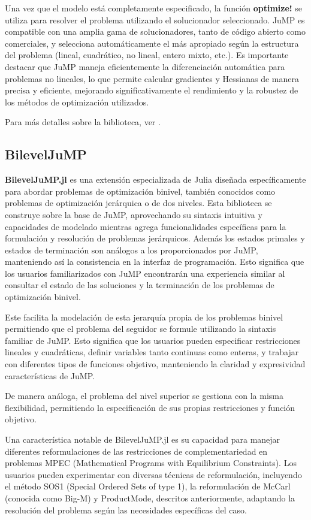 Una vez que el modelo está completamente especificado, la función \textbf{optimize!} se utiliza para resolver el problema utilizando el solucionador seleccionado. JuMP es compatible con una amplia gama de solucionadores, tanto de código abierto como comerciales, y selecciona automáticamente el más apropiado según la estructura del problema (lineal, cuadrático, no lineal, entero mixto, etc.). Es importante destacar que JuMP maneja eficientemente la diferenciación automática para problemas no lineales, lo que permite calcular gradientes y Hessianas de manera precisa y eficiente, mejorando significativamente el rendimiento y la robustez de los métodos de optimización utilizados.

Para más detalles sobre la biblioteca, ver \cite{JuMPPaper}.
\subsection*{BilevelJuMP}
\textbf{BilevelJuMP.jl} es una extensión especializada de Julia diseñada específicamente para abordar problemas de optimización binivel, también conocidos como problemas de optimización jerárquica o de dos niveles. Esta biblioteca se construye sobre la base de JuMP, aprovechando su sintaxis intuitiva y capacidades de modelado mientras agrega funcionalidades específicas para la formulación y resolución de problemas jerárquicos.
Además los estados primales y estados de terminación son análogos a los proporcionados por JuMP, manteniendo así la consistencia en la interfaz de programación. Esto significa que los usuarios familiarizados con JuMP encontrarán una experiencia similar al consultar el estado de las soluciones y la terminación de los problemas de optimización binivel.

Este facilita la modelación de esta jerarquía propia de los problemas binivel permitiendo que el problema del seguidor se formule utilizando la sintaxis familiar de JuMP. Esto significa que los usuarios pueden especificar restricciones lineales y cuadráticas, definir variables tanto continuas como enteras, y trabajar con diferentes tipos de funciones objetivo, manteniendo la claridad y expresividad características de JuMP. 

De manera análoga, el problema del nivel superior se gestiona con la misma flexibilidad, permitiendo la especificación de sus propias restricciones y función objetivo.

Una característica notable de BilevelJuMP.jl es su capacidad para manejar diferentes reformulaciones de las restricciones de complementariedad en problemas MPEC (Mathematical Programs with Equilibrium Constraints). Los usuarios pueden experimentar con diversas técnicas de reformulación, incluyendo el método SOS1 (Special Ordered Sets of type 1), la reformulación de McCarl (conocida como Big-M) y ProductMode, descritos anteriormente, adaptando la resolución del problema según las necesidades específicas del caso.

